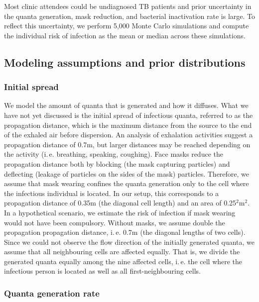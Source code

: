 \documentclass[fleqn,11pt]{wlscirep_supp}
\newcommand\ie{i.\,e.\xspace}
\begin{document}
Most clinic attendees could be undiagnosed TB patients and prior uncertainty in the quanta generation, mask reduction, and bacterial inactivation rate is large. To reflect this uncertainty, we perform 5,000 Monte Carlo simulations and compute the individual risk of infection as the mean or median across these simulations.  

\subsection{Modeling assumptions and prior distributions}\label{sec:priors}

\subsubsection{Initial spread}

We model the amount of quanta that is generated and how it diffuses. What we have not yet discussed is the initial spread of infectious quanta, referred to as the propagation distance, which is the maximum distance from the source to the end of the exhaled air before dispersion. An analysis of exhalation activities suggest a propagation distance of 0.7m\cite{Tang2013PLoSOne}, but larger distances may be reached depending on the activity (\ie breathing, speaking, coughing). Face masks reduce the propagation distance both by blocking (the mask capturing particles) and deflecting (leakage of particles on the sides of the mask) particles\cite{Tang2009RoyalInt,Hui2012PLoSOne,Mansour2013AerosolMed}. Therefore, we assume that mask wearing confines the quanta generation only to the cell where the infectious individual is located. In our setup, this corresponds to a propagation distance of 0.35m (the diagonal cell length) and an area of 0.25$^2$m$^2$. In a hypothetical scenario, we estimate the risk of infection if mask wearing would not have been compulsory. Without masks, we assume double the propagation propagation distance, \ie 0.7m (the diagonal lengths of two cells)\cite{Tang2013PLoSOne}. Since we could not observe the flow direction of the initially generated quanta, we assume that all neighbouring cells are affected equally. That is, we divide the generated quanta equally among the nine affected cells, \ie the cell where the infectious person is located as well as all first-neighbouring cells.


\subsubsection{Quanta generation rate}
\end{document}
